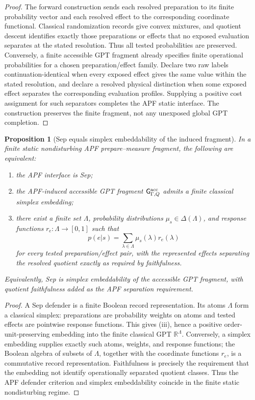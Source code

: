 \documentclass[11pt]{article}
\newtheorem{proposition}[theorem]{Proposition}
\newcommand{\R}{\mathbb R}
\begin{document}
\begin{proof}
The forward construction sends each resolved preparation to its finite probability vector and each resolved effect to the corresponding coordinate functional.  Classical randomization records give convex mixtures, and quotient descent identifies exactly those preparations or effects that no exposed evaluation separates at the stated resolution.  Thus all tested probabilities are preserved.  Conversely, a finite accessible GPT fragment already specifies finite operational probabilities for a chosen preparation/effect family.  Declare two raw labels continuation-identical when every exposed effect gives the same value within the stated resolution, and declare a resolved physical distinction when some exposed effect separates the corresponding evaluation profiles.  Supplying a positive cost assignment for such separators completes the APF static interface.  The construction preserves the finite fragment, not any unexposed global GPT completion.
\end{proof}

\begin{proposition}[Sep equals simplex embeddability of the induced fragment]\label{prop:sep-simplex-embeddability}
In a finite static nondisturbing APF prepare--measure fragment, the following are equivalent:
\begin{enumerate}[label=(\roman*)]
\item the APF interface is Sep;
\item the APF-induced accessible GPT fragment \(\mathsf G_{\Gamma,Q}^{\rm acc}\) admits a finite classical simplex embedding;
\item there exist a finite set \(\Lambda\), probability distributions \(\mu_s\in\Delta(\Lambda)\), and response functions \(r_e:\Lambda\to[0,1]\) such that
\[
  p(e|s)=\sum_{\lambda\in\Lambda}\mu_s(\lambda)r_e(\lambda)
\]
for every tested preparation/effect pair, with the represented effects separating the resolved quotient exactly as required by faithfulness.
\end{enumerate}
Equivalently, Sep is simplex embeddability of the accessible GPT fragment, with quotient faithfulness added as the APF separation requirement.
\end{proposition}

\begin{proof}
A Sep defender is a finite Boolean record representation.  Its atoms \(\Lambda\) form a classical simplex: preparations are probability weights on atoms and tested effects are pointwise response functions.  This gives (iii), hence a positive order-unit-preserving embedding into the finite classical GPT \(\R^\Lambda\).  Conversely, a simplex embedding supplies exactly such atoms, weights, and response functions; the Boolean algebra of subsets of \(\Lambda\), together with the coordinate functions \(r_e\), is a commutative record representation.  Faithfulness is precisely the requirement that the embedding not identify operationally separated quotient classes.  Thus the APF defender criterion and simplex embeddability coincide in the finite static nondisturbing regime.
\end{proof}
\end{document}
